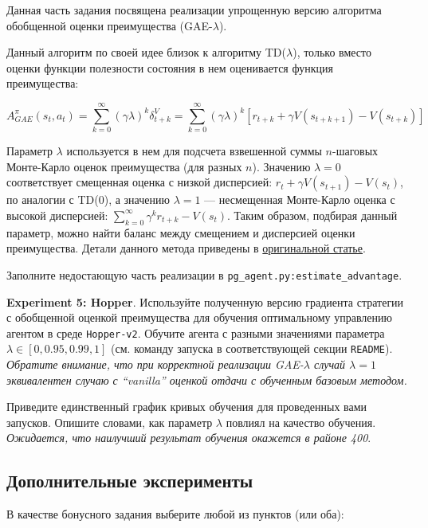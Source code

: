 \documentclass[12pt, oneside]{article}
\begin{document}
Данная часть задания посвящена реализации упрощенную версию алгоритма обобщенной оценки преимущества (GAE-$\lambda$).

Данный алгоритм по своей идее близок к алгоритму TD($\lambda$), только вместо оценки функции полезности состояния в нем оценивается функция преимущества:

\begin{equation}
    A_{GAE}^\pi (s_t, a_t) = \sum_{k=0}^{\infty} {(\gamma \lambda)^k \delta_{t+k}^V} = \sum_{k=0}^{\infty} {(\gamma \lambda)^k [r_{t+k} + \gamma V(s_{t+k+1}) - V(s_{t+k})]}
\end{equation}

\noindent
Параметр $\lambda$ используется в нем для подсчета взвешенной суммы $n$-шаговых Монте-Карло оценок преимущества (для разных $n$). Значению $\lambda = 0$ соответствует смещенная оценка с низкой дисперсией: $r_t + \gamma V(s_{t+1}) - V(s_t)$, по аналогии с TD(0), а значению $\lambda = 1$ --- несмещенная Монте-Карло оценка с высокой дисперсией: $\sum_{k=0}^{\infty} {\gamma^k r_{t+k}} - V(s_t)$. Таким образом, подбирая данный параметр, можно найти баланс между смещением и дисперсией оценки преимущества. Детали данного метода приведены в \href{https://arxiv.org/pdf/1506.02438.pdf}{оригинальной статье}.

Заполните недостающую часть реализации в \verb|pg_agent.py:estimate_advantage|.

\textbf{Experiment 5: Hopper}. Используйте полученную версию градиента стратегии с обобщенной оценкой преимущества для обучения оптимальному управлению агентом в среде \verb|Hopper-v2|. Обучите агента с разными значениями параметра $\lambda \in [0, 0.95, 0.99, 1]$ (см. команду запуска в соответствующей секции \verb|README|). \textit{Обратите внимание, что при корректной реализации GAE-$\lambda$ случай $\lambda = 1$ эквивалентен случаю с ``vanilla'' оценкой отдачи с обученным базовым методом.}

Приведите единственный график кривых обучения для проведенных вами запусков. Опишите словами, как параметр $\lambda$ повлиял на качество обучения. \textit{Ожидается, что наилучший результат обучения окажется в районе 400}.

\subsection{Дополнительные эксперименты}

В качестве бонусного задания выберите любой из пунктов (или оба):
\end{document}

